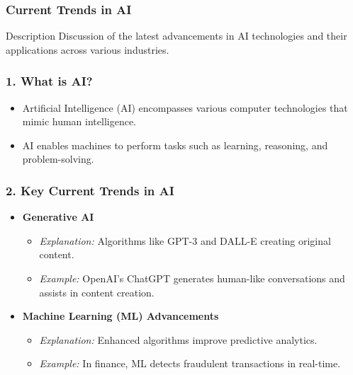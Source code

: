 \documentclass[aspectratio=169]{beamer}
\begin{document}
\begin{frame}[fragile]
    \frametitle{Current Trends in AI}
    \begin{block}{Description}
        Discussion of the latest advancements in AI technologies and their applications across various industries.
    \end{block}
\end{frame}

\begin{frame}[fragile]
    \frametitle{1. What is AI?}
    \begin{itemize}
        \item Artificial Intelligence (AI) encompasses various computer technologies that mimic human intelligence.
        \item AI enables machines to perform tasks such as learning, reasoning, and problem-solving.
    \end{itemize}
\end{frame}

\begin{frame}[fragile]
    \frametitle{2. Key Current Trends in AI}
    \begin{itemize}
        \item \textbf{Generative AI}
            \begin{itemize}
                \item \textit{Explanation:} Algorithms like GPT-3 and DALL-E creating original content.
                \item \textit{Example:} OpenAI’s ChatGPT generates human-like conversations and assists in content creation.
            \end{itemize}

        \item \textbf{Machine Learning (ML) Advancements}
            \begin{itemize}
                \item \textit{Explanation:} Enhanced algorithms improve predictive analytics.
                \item \textit{Example:} In finance, ML detects fraudulent transactions in real-time.
            \end{itemize}
    \end{itemize}
\end{frame}
\end{document}
